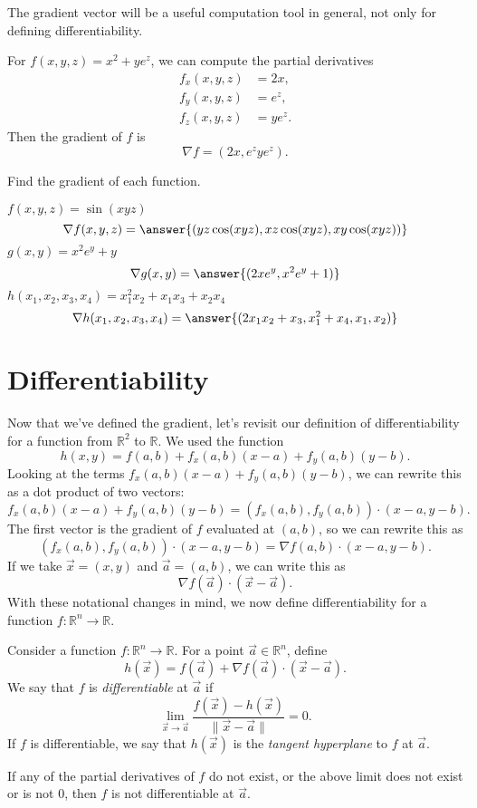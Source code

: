 \documentclass{ximera}
\begin{document}
The gradient vector will be a useful computation tool in general, not only for defining differentiability.

\begin{example}
For $f(x,y,z) = x^2+ye^z$, we can compute the partial derivatives
\begin{align*}
f_x(x,y,z) &= 2x,\\
f_y(x,y,z) &= e^z,\\
f_z(x,y,z) &= ye^z. 
\end{align*} 
Then the gradient of $f$ is
\[
\nabla f = (2x, e^z ye^z).
\]
\end{example}

\begin{problem}
Find the gradient of each function.

$f(x,y,z) = \sin(xyz)$
\[
\nabla f(x,y,z) = \answer{(yz\cos(xyz), xz\cos(xyz),xy\cos(xyz))}
\]
$g(x,y) = x^2e^y + y$
\[
\nabla g(x,y) = \answer{(2xe^y, x^2e^y+1)}
\]
$h(x_1,x_2,x_3,x_4) = x_1^2x_2+x_1x_3+x_2x_4$
\[
\nabla h(x_1,x_2,x_3,x_4) = \answer{(2x_1x_2+x_3,x_1^2+x_4,x_1,x_2)}
\]
\end{problem}

\section*{Differentiability}

Now that we've defined the gradient, let's revisit our definition of differentiability for a function from $\mathbb{R}^2$ to $\mathbb{R}$. We used the function
\[
h(x,y) = f(a,b) + f_x(a,b)(x-a)+f_y(a,b)(y-b).
\]
Looking at the terms $f_x(a,b)(x-a)+f_y(a,b)(y-b)$, we can rewrite this as a dot product of two vectors:
\[
f_x(a,b)(x-a)+f_y(a,b)(y-b) = (f_x(a,b), f_y(a,b))\cdot (x-a,y-b).
\]
The first vector is the gradient of $f$ evaluated at $(a,b)$, so we can rewrite this as
\[
(f_x(a,b), f_y(a,b))\cdot (x-a,y-b) = \nabla f(a,b)\cdot (x-a,y-b).
\]
If we take $\vec{x}=(x,y)$ and $\vec{a} = (a,b)$, we can write this as
\[
\nabla f(\vec{a})\cdot (\vec{x}-\vec{a}).
\]
With these notational changes in mind, we now define differentiability for a function $f:\mathbb{R}^n\rightarrow\mathbb{R}$.

\begin{definition}
Consider a function $f:\mathbb{R}^n\rightarrow\mathbb{R}$. For a point $\vec{a}\in\mathbb{R}^n$, define
\[
h(\vec{x}) = f(\vec{a})+\nabla f(\vec{a})\cdot (\vec{x}-\vec{a}).
\]
We say that $f$ is \emph{differentiable} at $\vec{a}$ if
\[
\lim_{\vec{x}\rightarrow \vec{a}}\frac{f(\vec{x}) - h(\vec{x})}{\|\vec{x}-\vec{a}\|} = 0.
\]
If $f$ is differentiable, we say that $h(\vec{x})$ is the \emph{tangent hyperplane} to $f$ at $\vec{a}$.

If any of the partial derivatives of $f$ do not exist, or the above limit does not exist or is not $0$, then $f$ is not differentiable at $\vec{a}$.
\end{definition}
\end{document}
